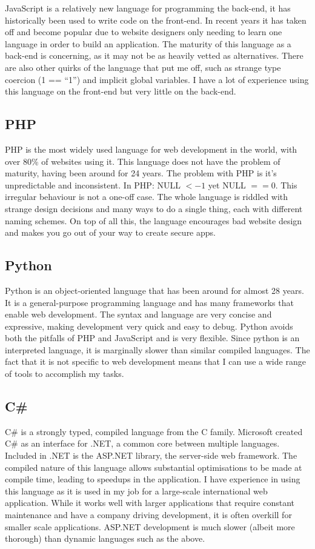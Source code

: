 \documentclass[a4paper,oneside,12pt]{report}
\begin{document}
	JavaScript is a relatively new language for programming the back-end, it has historically been used to write code on the front-end. In recent years it has taken off and become popular due to website designers only needing to learn one language in order to build an application. The maturity of this language as a back-end is concerning, as it may not be as heavily vetted as alternatives. There are also other quirks of the language that put me off, such as strange type coercion (1 == “1”) and implicit global variables. I have a lot of experience using this language on the front-end but very little on the back-end.

	\subsection{PHP}
	PHP is the most widely used language for web development in the world, with over 80\% of websites using it. This language does not have the problem of maturity, having been around for 24 years. The problem with PHP is it’s unpredictable and inconsistent. In PHP: NULL \(< -1\) yet NULL \(== 0\). This irregular behaviour is not a one-off case. The whole language is riddled with strange design decisions and many ways to do a single thing, each with different naming schemes. On top of all this, the language encourages bad website design and makes you go out of your way to create secure apps.

	\subsection{Python}
	Python is an object-oriented language that has been around for almost 28 years. It is a general-purpose programming language and has many frameworks that enable web development. The syntax and language are very concise and expressive, making development very quick and easy to debug. Python avoids both the pitfalls of PHP and JavaScript and is very flexible. Since python is an interpreted language, it is marginally slower than similar compiled languages. The fact that it is not specific to web development means that I can use a wide range of tools to accomplish my tasks.
	
	\subsection{C\#}
	C\# is a strongly typed, compiled language from the C family. Microsoft created C\# as an interface for .NET, a common core between multiple languages. Included in .NET is the ASP.NET library, the server-side web framework. The compiled nature of this language allows substantial optimisations to be made at compile time, leading to speedups in the application. I have experience in using this language as it is used in my job for a large-scale international web application. While it works well with larger applications that require constant maintenance and have a company driving development, it is often overkill for smaller scale applications. ASP.NET development is much slower (albeit more thorough) than dynamic languages such as the above.
	
\end{document}

